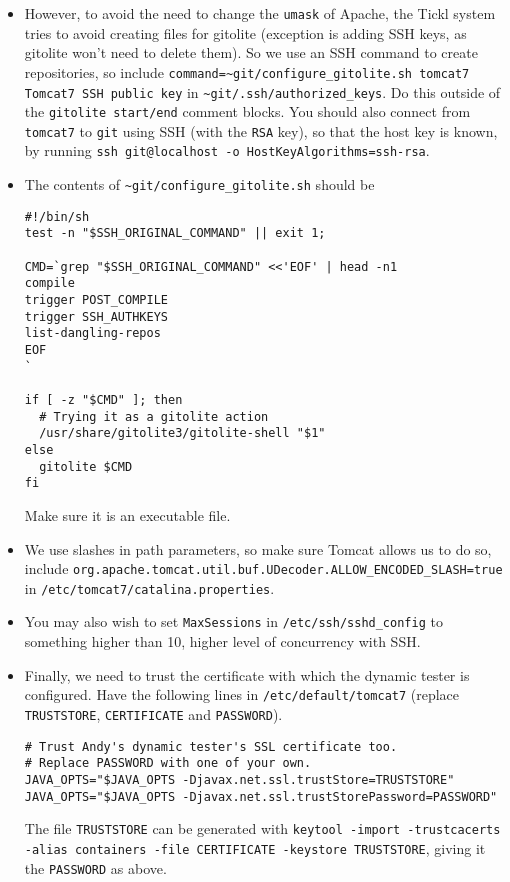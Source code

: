 \documentclass[12pt,a4paper]{article}
\newcommand{\gitoliteAuthkeys}{{\tt \~{}git/\hspace{0pt}.ssh/\hspace{0pt}authorized\_keys}}
\begin{document}
\begin{itemize}
  \item However, to avoid the need to change the {\tt umask} of Apache, the Tickl system tries to avoid creating files for gitolite (exception is adding SSH keys, as gitolite won't need to delete them).
    So we use an SSH command to create repositories, so include {\tt command=\textquotedbl{}\~{}git{}/configure\_gitolite.sh tomcat7\textquotedbl{} Tomcat7 SSH public key} in \gitoliteAuthkeys{}.
    Do this outside of the {\tt gitolite start/end} comment blocks.
    You should also connect from {\tt tomcat7} to {\tt git} using SSH (with the {\tt RSA} key), so that the host key is known, by running {\tt ssh git@localhost -o HostKeyAlgorithms=ssh-rsa}.

  \item The contents of {\tt \~{}git{}/configure\_gitolite.sh} should be
    \begin{verbatim}
#!/bin/sh
test -n "$SSH_ORIGINAL_COMMAND" || exit 1;

CMD=`grep "$SSH_ORIGINAL_COMMAND" <<'EOF' | head -n1
compile
trigger POST_COMPILE
trigger SSH_AUTHKEYS
list-dangling-repos
EOF
`

if [ -z "$CMD" ]; then
  # Trying it as a gitolite action
  /usr/share/gitolite3/gitolite-shell "$1"
else
  gitolite $CMD
fi
    \end{verbatim}
    Make sure it is an executable file.

  \item We use slashes in path parameters, so make sure Tomcat allows us to do so, include {\tt org.apache.tomcat.util.buf.UDecoder.ALLOW\_ENCODED\_SLASH=true} in {\tt /etc/tomcat7/catalina.properties}.
    
  \item You may also wish to set {\tt MaxSessions} in {\tt /etc/ssh/sshd\_config} to something higher than 10, higher level of concurrency with SSH\@.

  \item Finally, we need to trust the certificate with which the dynamic tester is configured.
    Have the following lines in {\tt /etc/default/tomcat7} (replace {\tt TRUSTSTORE}, {\tt CERTIFICATE} and {\tt PASSWORD}).
    \begin{verbatim}
# Trust Andy's dynamic tester's SSL certificate too.
# Replace PASSWORD with one of your own.
JAVA_OPTS="$JAVA_OPTS -Djavax.net.ssl.trustStore=TRUSTSTORE"
JAVA_OPTS="$JAVA_OPTS -Djavax.net.ssl.trustStorePassword=PASSWORD"
    \end{verbatim}

    The file {\tt TRUSTSTORE} can be generated with {\tt keytool -import -trustcacerts -alias containers -file CERTIFICATE -keystore {\tt TRUSTSTORE}}, giving it the {\tt PASSWORD} as above.
\end{itemize}
\end{document}
